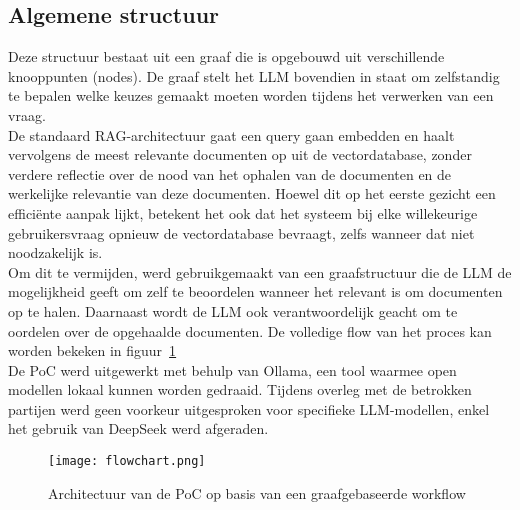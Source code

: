 \subsection{Algemene structuur}

Deze structuur bestaat uit een graaf die is opgebouwd uit verschillende knooppunten (nodes). De graaf stelt het LLM bovendien in staat om zelfstandig te bepalen welke keuzes gemaakt moeten worden tijdens het verwerken van een vraag.
\\[1em]
De standaard RAG-architectuur gaat een query gaan embedden en haalt vervolgens de meest relevante documenten op uit de vectordatabase, zonder verdere reflectie over de nood van het ophalen van de documenten en de werkelijke relevantie van deze documenten. Hoewel dit op het eerste gezicht een efficiënte aanpak lijkt, betekent het ook dat het systeem bij elke willekeurige gebruikersvraag opnieuw de vectordatabase bevraagt, zelfs wanneer dat niet noodzakelijk is.
\\[1em]
Om dit te vermijden, werd gebruikgemaakt van een graafstructuur die de LLM de mogelijkheid geeft om zelf te beoordelen wanneer het relevant is om documenten op te halen. Daarnaast wordt de LLM ook verantwoordelijk geacht om te oordelen over de opgehaalde documenten. De volledige flow van het proces kan worden bekeken in figuur~\ref{fig:Architectuur}
\\[1em]
De PoC werd uitgewerkt met behulp van Ollama, een tool waarmee open modellen lokaal kunnen worden gedraaid. Tijdens overleg met de betrokken partijen werd geen voorkeur uitgesproken voor specifieke LLM-modellen, enkel het gebruik van DeepSeek werd afgeraden.

\begin{figure}[H]
    \texttt{[image: flowchart.png]}
    \caption{Architectuur van de PoC op basis van een graafgebaseerde workflow}
    \label{fig:Architectuur}
\end{figure}


